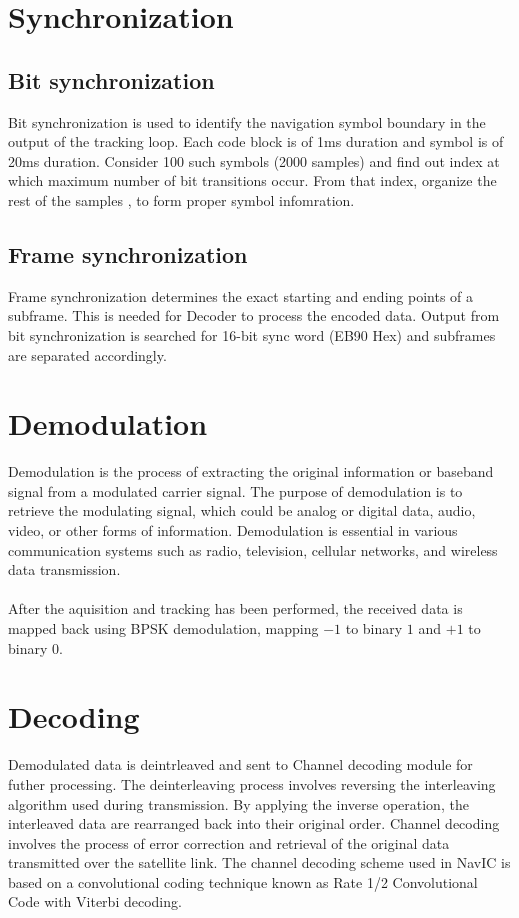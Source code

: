 \section{Synchronization}
\subsection{Bit synchronization}
\noindent Bit synchronization is used to identify  the navigation symbol boundary in the output of the tracking loop. Each code block is of 1ms duration and symbol is of 20ms duration. Consider 100 such symbols (2000 samples) and find out index at which maximum number of bit transitions occur. From that index, organize the rest of the samples , to form proper symbol infomration.


\subsection{Frame synchronization}
\noindent Frame synchronization determines the exact starting and ending points of a subframe.  This is needed for Decoder to process the encoded data. Output from bit synchronization is searched for 16-bit sync word (EB90 Hex) and subframes are separated accordingly.

\section{Demodulation}
Demodulation is the process of extracting the original information or baseband signal from a modulated carrier signal. The purpose of demodulation is to retrieve the modulating signal, which could be analog or digital data, audio, video, or other forms of information. Demodulation is essential in various communication systems such as radio, television, cellular networks, and wireless data transmission.
\\
\\
After the aquisition and tracking has been performed, the received data is mapped back using BPSK demodulation, mapping $-1$ to binary $1$ and $+1$ to binary $0$.

\section{Decoding}
Demodulated data is deintrleaved and sent to Channel decoding module for futher processing. The deinterleaving process involves reversing the interleaving algorithm used during transmission. By applying the inverse operation, the interleaved data are rearranged back into their original order. 
Channel decoding involves the process of error correction and retrieval of the original data transmitted over the satellite link. The channel decoding scheme used in NavIC is based on a convolutional coding technique known as Rate 1/2 Convolutional Code with Viterbi decoding.

